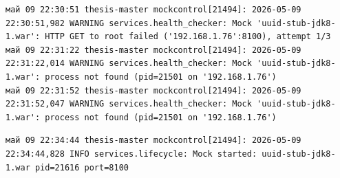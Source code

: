 \clearpage
\begin{listing}[H]
\caption{Сценарий~4. Журнал службы mockcontrol: заглушка переведена в статус ERROR после обнаружения аварийного завершения процесса}
\label{lst:hc-error-detected-log}
\begin{mdframed}
\begin{verbatim}
май 09 22:30:51 thesis-master mockcontrol[21494]: 2026-05-09 22:30:51,982 WARNING services.health_checker: Mock 'uuid-stub-jdk8-1.war': HTTP GET to root failed ('192.168.1.76':8100), attempt 1/3
май 09 22:31:22 thesis-master mockcontrol[21494]: 2026-05-09 22:31:22,014 WARNING services.health_checker: Mock 'uuid-stub-jdk8-1.war': process not found (pid=21501 on '192.168.1.76')
май 09 22:31:52 thesis-master mockcontrol[21494]: 2026-05-09 22:31:52,047 WARNING services.health_checker: Mock 'uuid-stub-jdk8-1.war': process not found (pid=21501 on '192.168.1.76')
\end{verbatim}
\end{mdframed}
\end{listing}

\clearpage
\begin{listing}[H]
\caption{Сценарий~5. Журнал службы mockcontrol: заглушка вернулась в состояние RUNNING}
\label{lst:hc-error-restored-log}
\begin{mdframed}
\begin{verbatim}
май 09 22:34:44 thesis-master mockcontrol[21494]: 2026-05-09 22:34:44,828 INFO services.lifecycle: Mock started: uuid-stub-jdk8-1.war pid=21616 port=8100
\end{verbatim}
\end{mdframed}
\end{listing}